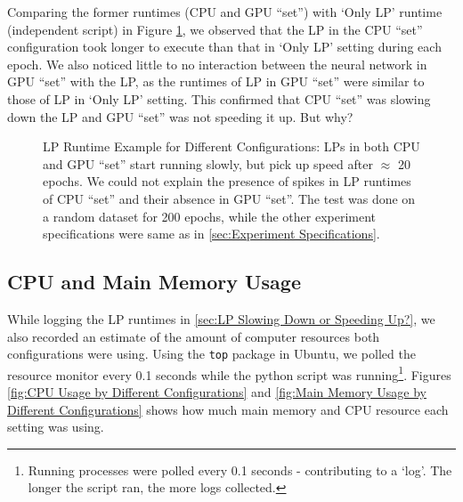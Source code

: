 \begin{appendices}
    Comparing the former runtimes (CPU and GPU ``set'') with `Only LP' runtime (independent script) in Figure \ref{fig:LP Runtime Example for Different Configurations}, we observed that the LP in the CPU ``set'' configuration took longer to execute than that in  `Only LP' setting during each epoch. We also noticed little to no interaction between the neural network in GPU ``set'' with the LP, as the runtimes of LP in GPU ``set'' were similar to those of LP in `Only LP' setting. This confirmed that CPU ``set'' was slowing down the LP and GPU ``set'' was not speeding it up. But why?
    \begin{figure}[!htbp]
        \centering
        \caption[LP Runtime Example for Different Configurations]{LP Runtime Example for Different Configurations: LPs in both CPU and GPU ``set'' start running slowly, but pick up speed after $\approx$ 20 epochs. We could not explain the presence of spikes in LP runtimes of CPU ``set'' and their absence in GPU ``set''. The test was done on a random dataset for 200 epochs, while the other experiment specifications were same as in \cref{sec:Experiment Specifications}.}
        \label{fig:LP Runtime Example for Different Configurations}
    \end{figure}
    
    \subsection{CPU and Main Memory Usage} \label{app:CPU and Main Memory Usage}
    While logging the LP runtimes in \cref{sec:LP Slowing Down or Speeding Up?}, we also recorded an estimate of the amount of computer resources both configurations were using. Using the \texttt{top} package in Ubuntu, we polled the resource monitor every 0.1 seconds while the python script was running\footnote{\label{foo:logs not epochs} Running processes were polled every 0.1 seconds - contributing to a `log'. The longer the script ran, the more logs collected.}. Figures \ref{fig:CPU Usage by Different Configurations} and \ref{fig:Main Memory Usage by Different Configurations} shows how much main memory and CPU resource each setting was using.
    

\end{appendices}
